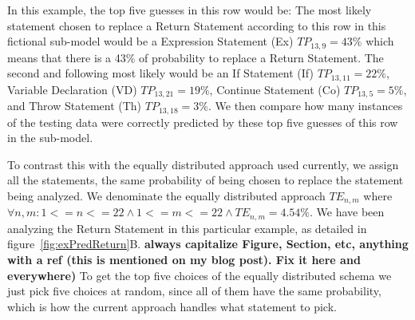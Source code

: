 \documentclass[conference]{IEEEtran}
\newcommand{\todo}[1]
  {{\scriptsize \textbf{\color{red} {#1}}}}
\begin{document}
{In this example, the top five guesses in this row would be: The most 
likely statement chosen to replace a Return Statement according to this row in 
this fictional sub-model would be a Expression Statement (Ex) $TP_{13,9} = 43\%$ 
which means that there is a 43\% of probability to replace a Return Statement. 
The second and following most likely would be an If Statement (If) $TP_{13,11} = 22\%$, Variable Declaration (VD)  $TP_{13,21} = 19\%$, 
Continue Statement (Co)  $TP_{13,5} = 5\%$, and Throw Statement (Th) $TP_{13,18} = 3\%$. We then compare how many instances of the testing data were correctly predicted 
by these top five guesses of this row in the sub-model. 


To contrast this with the equally distributed approach used currently, 
we assign all the statements, the same probability of being chosen to replace 
the statement being analyzed. We denominate the equally distributed approach 
$TE_{n,m}$ where $\forall n,m: 1<=n<=22 \land 1<=m<=22 \land TE_{n,m} = 4.54\%$. 
We have been analyzing the Return Statement in this particular example, as 
detailed in figure~\ref{fig:exPredReturn}B.\todo{always capitalize Figure,
  Section, etc, anything with a ref (this is mentioned on my blog post).  Fix it
  here and everywhere)} To get the top five choices of the 
equally distributed schema we just pick five choices at random, since all of 
them have the same probability, which is how the current approach handles what 
statement to pick.

}
\end{document}

